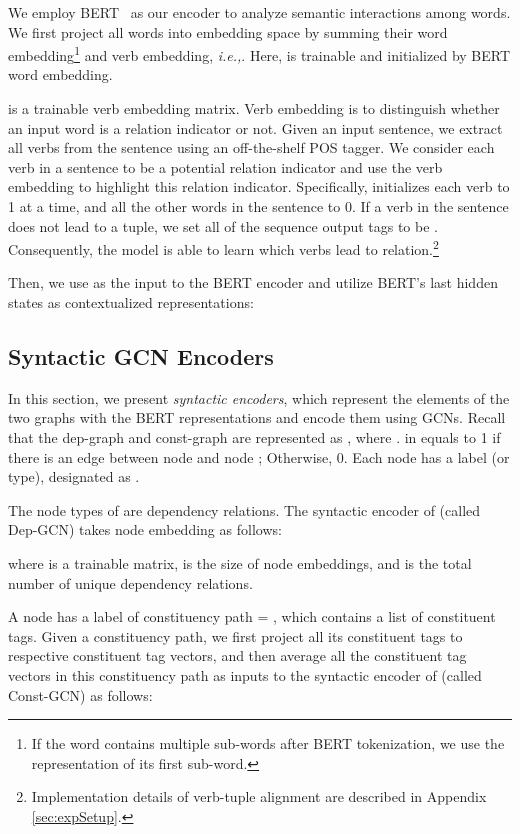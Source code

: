 \documentclass[11pt]{article}
\newcommand{\ie}{\emph{i.e.,}\xspace}
\begin{document}
We employ BERT~\cite{devlin2018bert} as our encoder to analyze semantic interactions among words.
We first project all words  into embedding space by summing their word embedding\footnote{If the word contains multiple sub-words after BERT tokenization, we use the representation of its first sub-word.} and verb embedding, \ie .
Here,  is trainable and initialized by BERT word embedding.

 is a trainable verb embedding matrix. 
Verb embedding is to distinguish whether an input word is a relation indicator or not.
Given an input sentence, we extract all verbs from the sentence using an off-the-shelf POS tagger.
We consider each verb in a sentence to be a potential relation indicator and use the verb embedding to highlight this relation indicator. 
Specifically,  initializes each verb to 1 at a time, and all the other words in the sentence to 0.
If a verb in the sentence does not lead to a tuple, we set all of the sequence output tags to be .
Consequently, the model is able to learn which verbs lead to relation.\footnote{Implementation details of verb-tuple alignment are described in Appendix \ref{sec:expSetup}.}

Then, we use  as the input to the BERT encoder and utilize BERT's last hidden states as contextualized representations:





\subsection{Syntactic GCN Encoders}



In this section, we present \textit{syntactic encoders}, which represent the elements of the two graphs with the BERT representations and encode them using GCNs.
Recall that the dep-graph and const-graph are represented as , where . 
 in  equals to 1 if there is an edge between node  and node ;
Otherwise, 0. Each node  has a label (or type), designated as .

The node types of  are dependency relations. 
The  syntactic encoder of  (called Dep-GCN) takes node embedding as follows:

where  is a trainable matrix,  is the size of node embeddings, and  is the total number of unique dependency relations. 

A node  has a label of constituency path  = , which contains a list of constituent tags. Given a constituency path, we first project all its constituent tags to respective constituent tag vectors, and then average all the constituent tag vectors in this constituency path as inputs to the syntactic encoder of  (called Const-GCN) as follows:
\end{document}

